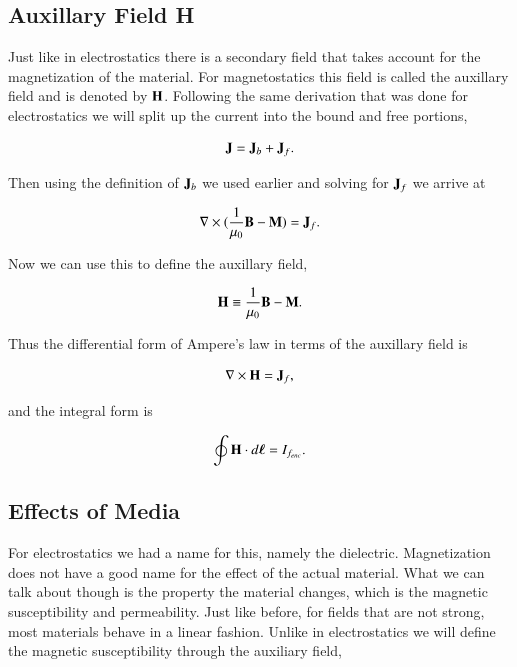\documentclass[preprint, review,12pt]{elsarticle}
\def\x{\times}
\def\.{\cdot}
\def\b{\textbf}
\def\bell{\bm{\ell}}
\def\={\equiv}
\def\curl{\nabla \x}
\begin{document}
\subsection{Auxillary Field H}

Just like in electrostatics there is a secondary field that takes account for the magnetization of the material. For magnetostatics this field is called the auxillary field and is denoted by $\b H$. Following the same derivation that was done for electrostatics we will split up the current into the bound and free portions,

\begin{equation}
    \b J = \b J_b + \b J_f.
\end{equation}

Then using the definition of $\b J_b$ we used earlier and solving for $\b J_f$ we arrive at 

\begin{equation}
    \curl ( \frac{1}{\mu_0}\b B - \b M) = \b J_f.
\end{equation}

Now we can use this to define the auxillary field,

\begin{equation}
    \b H \= \frac{1}{\mu_0} \b B - \b M.
\end{equation}

Thus the differential form of Ampere's law in terms of the auxillary field is

\begin{equation}
    \curl \b H = \b J_f,
\end{equation}

and the integral form is

\begin{equation}
    \oint \b H \. d \bell = I_{f_{enc}}.
\end{equation}

\subsection{Effects of Media}

For electrostatics we had a name for this, namely the dielectric. Magnetization does not have a good name for the effect of the actual material. What we can talk about though is the property the material changes, which is the magnetic susceptibility and permeability. Just like before, for fields that are not strong, most materials behave in a linear fashion. Unlike in electrostatics we will define the magnetic susceptibility through the auxiliary field,
\end{document}
